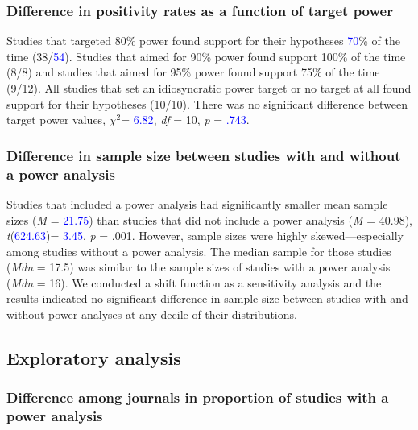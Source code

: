 \documentclass[
  man, donotrepeattitle,mask,floatsintext]{apa7}
\begin{document}
\pagebreak

\hypertarget{difference-in-positivity-rates-as-a-function-of-target-power}{%
\subsubsection{Difference in positivity rates as a function of target power}\label{difference-in-positivity-rates-as-a-function-of-target-power}}

Studies that targeted 80\% power found support for their hypotheses \textcolor{blue}{70}\% of the time (38/\textcolor{blue}{54}). Studies that aimed for 90\% power found support 100\% of the time (8/8) and studies that aimed for 95\% power found support 75\% of the time (9/12). All studies that set an idiosyncratic power target or no target at all found support for their hypotheses (10/10). There was no significant difference between target power values, \(\chi^2\)= \textcolor{blue}{6.82}, \emph{df} = 10, \emph{p} = \textcolor{blue}{.743}.

\hypertarget{difference-in-sample-size-between-studies-with-and-without-a-power-analysis}{%
\subsubsection{Difference in sample size between studies with and without a power analysis}\label{difference-in-sample-size-between-studies-with-and-without-a-power-analysis}}

Studies that included a power analysis had significantly smaller mean sample sizes (\emph{M} = \textcolor{blue}{21.75}) than studies that did not include a power analysis (\emph{M} = 40.98), \emph{t}(\textcolor{blue}{624.63})= \textcolor{blue}{3.45}, \emph{p} = .001. However, sample sizes were highly skewed---especially among studies without a power analysis. The median sample for those studies (\emph{Mdn} = 17.5) was similar to the sample sizes of studies with a power analysis (\emph{Mdn} = 16). We conducted a shift function as a sensitivity analysis and the results indicated no significant difference in sample size between studies with and without power analyses at any decile of their distributions.

\hypertarget{exploratory-analysis-1}{%
\subsection{Exploratory analysis}\label{exploratory-analysis-1}}

\hypertarget{difference-among-journals-in-proportion-of-studies-with-a-power-analysis}{%
\subsubsection{Difference among journals in proportion of studies with a power analysis}\label{difference-among-journals-in-proportion-of-studies-with-a-power-analysis}}
\end{document}
